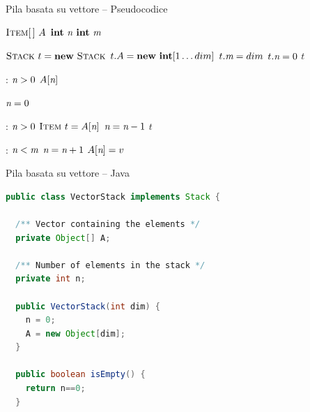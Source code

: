 \begin{frame}[shrink=5]{Pila basata su vettore -- Pseudocodice}

\begin{Procedure}
\caption{\Stack}
\begin{multicols}{2}

$\textsc{Item}[\,]\ A$
$\INTEGER\ \Size$
$\INTEGER\ \Capacity$
\BlankLine

{
  $\Stack\ t = \NEW\ \Stack$\;
  $t.A = \NEW\ \INTEGER[1 \mldots dim]$\;
  $t.\textit{m} = dim$\;
  $t.\textit{n} = 0$\;
  \Return $t$\;
}
\BlankLine
  
\PROCEDURE{\Item \stacktop()}
{
  \PRECONDITION: $\textit{n} > 0$\;
  \BlankLine
  \Return $A[\textit{n}]$
}
\columnbreak

\PROCEDURE{\BOOLEAN\ \stackempty()}
{
  \Return $\textit{n} = 0$\;
}
\BlankLine
  
\PROCEDURE{\Item \stackpop()}
{
  \PRECONDITION: $\textit{n} > 0$\;
  \BlankLine
  $\textsc{Item}\ t = A[\textit{n}]$\;
  $\textit{n} = \textit{n}-1$\;
  \Return $t$\;
}
\BlankLine

{
  \PRECONDITION: $\textit{n} < \textit{m}$\;
  \BlankLine
  $\textit{n} = \textit{n}+1$\;
  $A[\textit{n}] = v$\; 
}
\BlankLine

\end{multicols}
\BlankLine
\BlankLine

\end{Procedure}


\end{frame}



\begin{frame}[fragile,shrink=5]{Pila basata su vettore -- Java}

\vspace{-6pt}
\begin{lstlisting}[language=java]
public class VectorStack implements Stack {

  /** Vector containing the elements */
  private Object[] A;

  /** Number of elements in the stack */
  private int n;    

  public VectorStack(int dim) {
    n = 0; 
    A = new Object[dim];
  }

  public boolean isEmpty() { 
    return n==0; 
  }
\end{lstlisting}
  
\end{frame}

